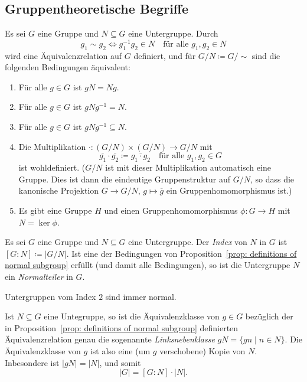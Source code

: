 \subsection{Gruppentheoretische Begriffe}


\begin{proposition}\label{prop: definitions of normal subgroup}
  Es sei $G$ eine Gruppe und $N \subseteq G$ eine Untergruppe.
  Durch
  \[
    g_1 \sim g_2
    \iff
    g_1^{-1} g_2 \in N
    \quad
    \text{für alle $g_1, g_2 \in N$}
  \]
  wird eine Äquivalenzrelation auf $G$ definiert, und für $G/N \coloneqq G/{\sim}$ sind die folgenden Bedingungen äquivalent:
  \begin{enumerate}[leftmargin=*, label=\roman*)]
    \item
      Für alle $g \in G$ ist $g N = N g$.
    \item
      Für alle $g \in G$ ist $g N g^{-1} = N$.
    \item
      Für alle $g \in G$ ist $g N g^{-1} \subseteq N$.
    \item
      Die Multiplikation $\cdot \colon (G/N) \times (G/N) \to G/N$ mit
      \[
        \overline{g_1} \cdot \overline{g_2} \coloneqq \overline{g_1 \cdot g_2}
        \quad
        \text{für alle $g_1, g_2 \in G$}
      \]
      ist wohldefiniert.
      ($G/N$ ist mit dieser Multiplikation automatisch eine Gruppe.
      Dies ist dann die eindeutige Gruppenstruktur auf $G/N$, so dass die kanonische Projektion $G \to G/N$, $g \mapsto \overline{g}$ ein Gruppenhomomorphismus ist.)
    \item
      Es gibt eine Gruppe $H$ und einen Gruppenhomomorphismus $\phi \colon G \to H$ mit $N = \ker \phi$.
  \end{enumerate}
\end{proposition}


\begin{definition}
  Es sei $G$ eine Gruppe und $N \subseteq G$ eine Untergruppe.
  Der \emph{Index} von $N$ in $G$ ist $[G : N] \coloneqq |G/N|$.
  Ist eine der Bedingungen von Proposition~\ref{prop: definitions of normal subgroup} erfüllt (und damit alle Bedingungen), so ist die Untergruppe $N$ ein \emph{Normalteiler} in $G$.
\end{definition}


\begin{remark}
  Untergruppen vom Index $2$ sind immer normal.
\end{remark}


\begin{remark}
  Ist $N \subseteq G$ eine Untegruppe, so ist die Äquivalenzklasse von $g \in G$ bezüglich der in Proposition~\ref{prop: definitions of normal subgroup} definierten Äquivalenzrelation genau die sogenannte \emph{Linksnebenklasse} $gN = \{gn \mid n \in N\}$. 
  Die Äquivalenzklasse von $g$ ist also eine (um $g$ verschobene) Kopie von $N$.
  Inbesondere ist $|gN| = |N|$, und somit
  \[
    |G| = [G : N] \cdot |N|.
  \]
\end{remark}


